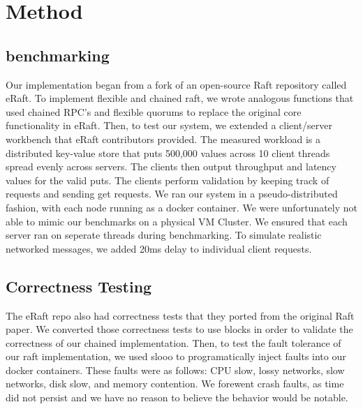 \section{Method}
\label{sec:method}
\subsection{benchmarking}
Our implementation began from a fork of an open-source Raft repository called eRaft.
To implement flexible and chained raft, we wrote analogous functions that used chained RPC's and flexible quorums to replace the original core functionality in eRaft. 
Then, to test our system, we extended a client/server workbench that eRaft contributors provided. 
The measured workload is a distributed key-value store that puts 500,000 values across 10 client threads spread evenly across servers. 
The clients then output throughput and latency values for the valid puts.
The clients perform validation by keeping track of requests and sending get requests.
We ran our system in a pseudo-distributed fashion, with each node running as a docker container. We were unfortunately not able to mimic our benchmarks on a physical VM Cluster. 
We ensured that each server ran on seperate threads during benchmarking. To simulate realistic networked messages, we added 20ms delay to individual client requests.

    \subsection{Correctness Testing}

    The eRaft repo also had correctness tests that they ported from the original Raft paper. We converted those correctness tests to use blocks in order to validate the correctness of our chained implementation. 
    Then, to test the fault tolerance of our raft implementation, we used slooo to programatically inject faults into our docker containers. These faults were as follows: CPU slow, lossy networks, slow networks, disk slow, and memory contention.
    We forewent crash faults, as time did not persist and we have no reason to believe the behavior would be notable.
